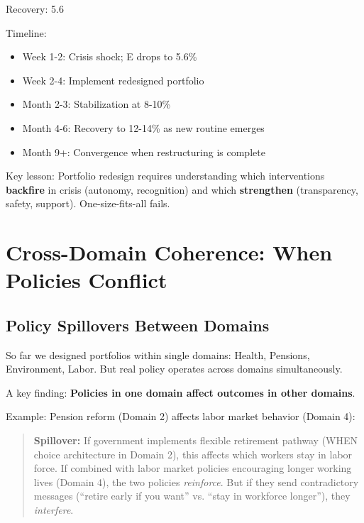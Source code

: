 Recovery: 5.6%

Timeline:
\begin{itemize}
\item Week 1-2: Crisis shock; E drops to 5.6\%
\item Week 2-4: Implement redesigned portfolio
\item Month 2-3: Stabilization at 8-10\%
\item Month 4-6: Recovery to 12-14\% as new routine emerges
\item Month 9+: Convergence when restructuring is complete
\end{itemize}

Key lesson: Portfolio redesign requires understanding which interventions \textbf{backfire} in crisis (autonomy, recognition) and which \textbf{strengthen} (transparency, safety, support). One-size-fits-all fails.


\section{Cross-Domain Coherence: When Policies Conflict}
\label{sec:cross-domain}

\subsection{Policy Spillovers Between Domains}

So far we designed portfolios within single domains: Health, Pensions, Environment, Labor. But real policy operates across domains simultaneously.

A key finding: \textbf{Policies in one domain affect outcomes in other domains}.

Example: Pension reform (Domain 2) affects labor market behavior (Domain 4):

\begin{quote}
\textbf{Spillover:} If government implements flexible retirement pathway (WHEN choice architecture in Domain 2), this affects which workers stay in labor force. If combined with labor market policies encouraging longer working lives (Domain 4), the two policies \emph{reinforce}. But if they send contradictory messages (``retire early if you want'' vs. ``stay in workforce longer''), they \emph{interfere}.
\end{quote}

